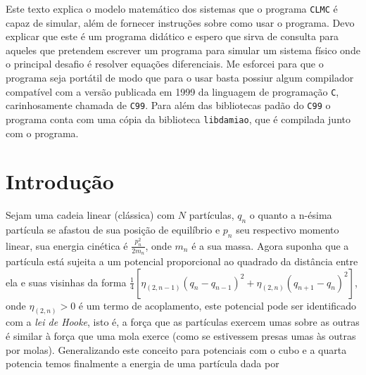 \documentclass[
   article,                      %
   10pt,                         %
   openright,                    %
   oneside,                      %
   a4paper,                      %
   sumario = tradicional,        %
	chapter=TITLE,		%
	section=TITLE,		%
	subsection=TITLE,	%
	subsubsection=TITLE,%
   english,                      %
   french,                       %
   spanish,                      %
   brazil,                       %
   xcolor=table                  %
]{abntex2}
\begin{document}
\maketitle

\begin{resumoumacoluna}
   Este texto explica o modelo matemático dos sistemas que o programa
   \texttt{CLMC} é capaz de simular, além de fornecer instruções sobre como
   usar o programa. Devo explicar que este é um programa didático e espero
   que sirva de consulta para aqueles que pretendem escrever um programa
   para simular um sistema físico onde o principal desafio é
   resolver equações diferenciais. Me esforcei para que o programa seja
   portátil de modo que para o usar basta possiur algum compilador
   compatível com a versão publicada em 1999 da linguagem de programação
   \texttt{C}, carinhosamente chamada de \texttt{C99}. Para além das bibliotecas
   padão do \texttt{C99} o programa conta com uma cópia da biblioteca
   \texttt{libdamiao},\cite{libdamiao} que é compilada junto com o programa.
\end{resumoumacoluna}

\textual

\section{Introdução}

Sejam uma cadeia linear (clássica) com $N$ partículas, $q_n$ o quanto
a n-ésima partícula se afastou de sua posição de equilíbrio e $p_n$
seu respectivo momento linear, sua energia cinética é
$\displaystyle\frac{p^2_n}{2 m_n}$, onde $m_n$ é a sua massa.
Agora suponha que a partícula está sujeita a um potencial
proporcional ao quadrado da distância entre ela e suas visinhas
da forma
$\frac{1}{4}[\eta_{(2, n-1)}(q_n - q_{n-1})^2 + \eta_{(2, n)}(q_{n+1} - q_n)^2]$,
onde $\eta_{(2, n)}>0$ é um termo de acoplamento, este potencial pode
ser identificado com a \textit{lei de Hooke}, isto é, a força que
as partículas exercem umas sobre as outras é similar à força que uma mola
exerce (como se estivessem presas umas às outras por molas).
Generalizando este conceito para potenciais com o cubo e a quarta potencia temos
finalmente a energia de uma partícula dada por
\end{document}
